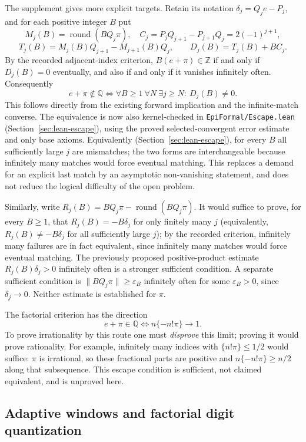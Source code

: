 \documentclass[11pt]{amsart}
\theoremstyle{definition}
\theoremstyle{remark}
\numberwithin{equation}{section}
\newcommand{\Q}{\mathbb{Q}}
\newcommand{\Z}{\mathbb{Z}}
\begin{document}
The supplement gives more explicit targets. Retain its notation $\delta_j=Q_je-P_j$, and for each positive integer $B$ put
\[
M_j(B)=\operatorname{round}(BQ_j\pi),\quad
C_j=P_jQ_{j+1}-P_{j+1}Q_j=2(-1)^{j+1},
\]
\[
T_j(B)=M_j(B)Q_{j+1}-M_{j+1}(B)Q_j,\qquad
D_j(B)=T_j(B)+BC_j.
\]
By the recorded adjacent-index criterion, $B(e+\pi)\in\Z$ if and only if $D_j(B)=0$ eventually, and also if and only if it vanishes infinitely often. Consequently
\[
e+\pi\notin\Q
\iff \forall B\ge1\ \forall N\ \exists j\ge N:\ D_j(B)\ne0.
\]
This follows directly from the existing forward implication and the infinite-match converse. The equivalence is now also kernel-checked in \texttt{EpiFormal/\allowbreak{}Escape.lean} (Section~\ref{sec:lean-escape}), using the proved selected-convergent error estimate and only base axioms. Equivalently (Section~\ref{sec:lean-escape}), for every $B$ all sufficiently large $j$ are mismatches; the two forms are interchangeable because infinitely many matches would force eventual matching. This replaces a demand for an explicit last match by an asymptotic non-vanishing statement, and does not reduce the logical difficulty of the open problem.

Similarly, write $R_j(B)=BQ_j\pi-\operatorname{round}(BQ_j\pi)$. It would suffice to prove, for every $B\ge1$, that $R_j(B)=-B\delta_j$ for only finitely many $j$ (equivalently, $R_j(B)\ne-B\delta_j$ for all sufficiently large $j$); by the recorded criterion, infinitely many failures are in fact equivalent, since infinitely many matches would force eventual matching. The previously proposed positive-product estimate $R_j(B)\delta_j>0$ infinitely often is a stronger sufficient condition. A separate sufficient condition is $\|BQ_j\pi\|\ge\varepsilon_B$ infinitely often for some $\varepsilon_B>0$, since $\delta_j\to0$. Neither estimate is established for $\pi$.

The factorial criterion has the direction
\[
e+\pi\in\Q\iff n\{-n!\pi\}\longrightarrow1.
\]
To prove irrationality by this route one must \emph{disprove} this limit; proving it would prove rationality. For example, infinitely many indices with $\{n!\pi\}\le1/2$ would suffice: $\pi$ is irrational, so these fractional parts are positive and $n\{-n!\pi\}\ge n/2$ along that subsequence. This escape condition is sufficient, not claimed equivalent, and is unproved here.

\subsection{Adaptive windows and factorial digit quantization}
\end{document}
